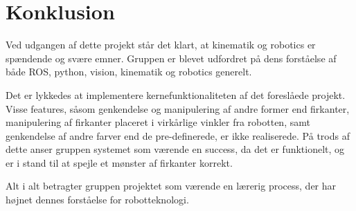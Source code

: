 \chapter{Konklusion}\label{chap:Konklusion}
Ved udgangen af dette projekt står det klart, at kinematik og robotics er spændende og svære emner.
Gruppen er blevet udfordret på dens forståelse af både ROS, python, vision, kinematik og robotics generelt. 

Det er lykkedes at implementere kernefunktionaliteten af det foreslåede projekt.
Visse features, såsom genkendelse og manipulering af andre former end firkanter, manipulering af firkanter placeret i virkårlige vinkler fra robotten, samt genkendelse af andre farver end de pre-definerede, er ikke realiserede.
På trods af dette anser gruppen systemet som værende en success, da det er funktionelt, og er i stand til at spejle et mønster af firkanter korrekt.  

Alt i alt betragter gruppen projektet som værende en lærerig process, der har højnet dennes forståelse for robotteknologi.
